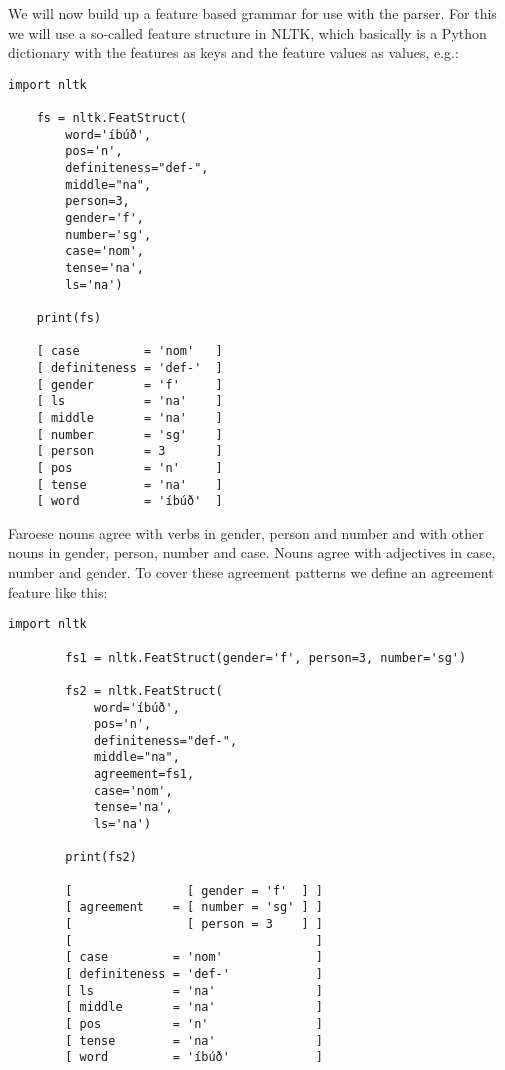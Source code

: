 \documentclass[12pt,%
]{lin-v2/lin}
\begin{document}
We will now build up a feature based grammar for use with the parser. For this we will use
a so-called feature structure in NLTK, which basically is a Python dictionary with the
features as keys and the feature values as values, e.g.:
\begin{lstlisting}[caption={A feature structure showing lexical features for the word \emph{íbúð}.}]
    import nltk
    
    fs = nltk.FeatStruct(
        word='íbúð',
        pos='n',
        definiteness="def-",
        middle="na",
        person=3,
        gender='f',
        number='sg',
        case='nom',
        tense='na',
        ls='na')

    print(fs)

    [ case         = 'nom'   ]
    [ definiteness = 'def-'  ]
    [ gender       = 'f'     ]
    [ ls           = 'na'    ]
    [ middle       = 'na'    ]
    [ number       = 'sg'    ]
    [ person       = 3       ]
    [ pos          = 'n'     ]
    [ tense        = 'na'    ]
    [ word         = 'íbúð'  ]
\end{lstlisting}


Faroese nouns agree with verbs in gender, person and number and with other nouns in
gender, person, number and case. Nouns agree with adjectives in case, number and gender.
To cover these agreement patterns we define an agreement feature like this:
\begin{lstlisting}[caption={A feature structure showing the word \emph{íbúð} with an \emph{agreement} feature.}]
        import nltk
        
        fs1 = nltk.FeatStruct(gender='f', person=3, number='sg')
        
        fs2 = nltk.FeatStruct(
            word='íbúð',
            pos='n',
            definiteness="def-",
            middle="na",
            agreement=fs1,
            case='nom',
            tense='na',
            ls='na')
    
        print(fs2)
    
        [                [ gender = 'f'  ] ]
        [ agreement    = [ number = 'sg' ] ]
        [                [ person = 3    ] ]
        [                                  ]
        [ case         = 'nom'             ]
        [ definiteness = 'def-'            ]
        [ ls           = 'na'              ]
        [ middle       = 'na'              ]
        [ pos          = 'n'               ]
        [ tense        = 'na'              ]
        [ word         = 'íbúð'            ]
\end{lstlisting}
\end{document}
